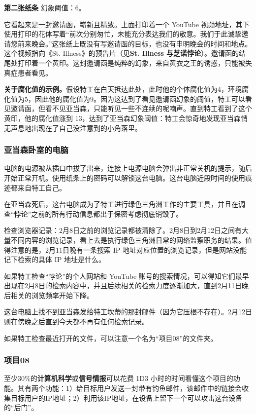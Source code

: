 \textbf{第二张纸条}
幻象阈值：6。

它看起来是一封邀请函，崭新且精致。上面打印着一个 YouTube 视频地址，其下使用打印的花体写着“前次分别匆忙，未能充分表达我们的敬意。我们于此诚挚邀请您前来晚会。”这张纸上既没有写邀请函的目标，也没有申明晚会的时间和地点。这个视频指向《St. Illness》的预告片（见\textbf{St. Illness 与芝诺悖论}）。邀请函的结尾处打印着一个黄印。这封邀请函是纯粹的幻象，来自黄衣之王的诱惑，只能被失真症患者看见。

\textbf{关于腐化值的示例。}假设特工在白天抵达此处，此时他的个体腐化值为4，环境腐化值为5，因此他的腐化值为9。因为这达到了看见邀请函幻象的阈值，特工可以看见邀请函，但看不见亚当森，只能听见一些不连续的呢喃声。直到特工看到了这个黄印，他的腐化值涨到 13，达到了亚当森幻象阈值：特工会惊奇地发现亚当森悄无声息地出现在了自己没注意到的小角落里。

\subsubsection{亚当森卧室的电脑}
电脑的电源被从插口中拔了出来，连接上电源电脑会弹出非正常关机的提示，随后开始正常开机。使用纸条上的密码可以解锁这台电脑。这台电脑近段时间的使用痕迹都来自特工自己。

在亚当森死后，这台电脑成为了特工进行绿色三角洲工作的主要工具，并且在调查“悖论”之前的所有行动信息都出于保密考虑彻底销毁了。

检查浏览器记录：2月8日之前的浏览记录都被清除了。2月8日到2月12日之间有大量不同内容的浏览记录，看上去是执行绿色三角洲日常的网络监察职务的结果。值得注意的是，2月11日晚有一条搜索 IP 地址对应位置的浏览记录，但是网站没能记下检索的具体 IP 地址是什么。

如果特工检查“悖论”的个人网站和 YouTube 账号的搜索情况，可以得知它们最早出现在2月8日的检索内容中，并且后续相关的检索力度逐渐加大，直到2月11日晚后相关的浏览频率开始下降。

这台电脑上找不到亚当森发给特工坎蒂的那封邮件（因为它压根不存在）。2月12日则在傍晚之后直到今天都不再有任何检索记录。

如果特工检查最近打开的文件，可以注意一个名为“项目08”的文件夹。

\subsubsection{项目08}
至少30\%的\textbf{计算机科学}或\textbf{信号情报}可以花费 1D3 小时的时间看懂这个项目的功能。其有两个功能：1）给目标用户发送一封带有钓鱼邮件，该邮件中的链接会收集目标用户的IP地址；2）利用该IP地址，在设备上留下一个可以攻击这台设备的“后门”。

